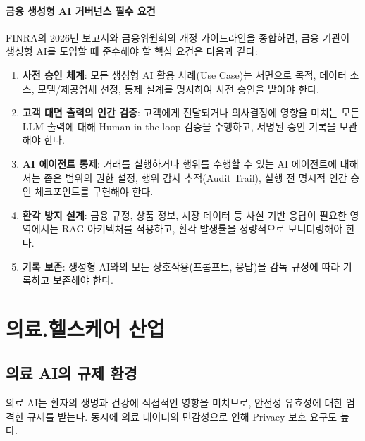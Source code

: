 \paragraph{금융 생성형 AI 거버넌스 필수 요건}

FINRA의 2026년 보고서와 금융위원회의 개정 가이드라인을 종합하면,
금융 기관이 생성형 AI를 도입할 때 준수해야 할 핵심 요건은 다음과 같다:

\begin{enumerate}
 \item \textbf{사전 승인 체계}: 모든 생성형 AI 활용 사례(Use Case)는
 서면으로 목적, 데이터 소스, 모델/제공업체 선정, 통제 설계를 명시하여
 사전 승인을 받아야 한다.

 \item \textbf{고객 대면 출력의 인간 검증}: 고객에게 전달되거나
 의사결정에 영향을 미치는 모든 LLM 출력에 대해 Human-in-the-loop 검증을
 수행하고, 서명된 승인 기록을 보관해야 한다.

 \item \textbf{AI 에이전트 통제}: 거래를 실행하거나 행위를 수행할 수 있는
 AI 에이전트에 대해서는 좁은 범위의 권한 설정, 행위 감사 추적(Audit Trail),
 실행 전 명시적 인간 승인 체크포인트를 구현해야 한다.

 \item \textbf{환각 방지 설계}: 금융 규정, 상품 정보, 시장 데이터 등
 사실 기반 응답이 필요한 영역에서는 RAG 아키텍처를 적용하고,
 환각 발생률을 정량적으로 모니터링해야 한다.

 \item \textbf{기록 보존}: 생성형 AI와의 모든 상호작용(프롬프트, 응답)을
 감독 규정에 따라 기록하고 보존해야 한다.
\end{enumerate}


\section{의료.헬스케어 산업}
\label{sec:5.2}

\subsection{의료 AI의 규제 환경}
\label{sec:5.2.1}

의료 AI는 환자의 생명과 건강에 직접적인 영향을 미치므로, 
안전성 유효성에 대한 엄격한 규제를 받는다. 
동시에 의료 데이터의 민감성으로 인해 Privacy 보호 요구도 높다.

